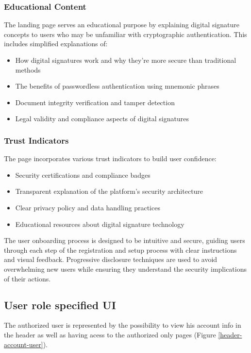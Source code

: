 \subsubsection{Educational Content}
The landing page serves an educational purpose by explaining digital signature concepts to users who may be unfamiliar with cryptographic authentication. This includes simplified explanations of:

\begin{itemize}
    \item How digital signatures work and why they're more secure than traditional methods
    \item The benefits of passwordless authentication using mnemonic phrases
    \item Document integrity verification and tamper detection
    \item Legal validity and compliance aspects of digital signatures
\end{itemize}

\subsubsection{Trust Indicators}
The page incorporates various trust indicators to build user confidence:

\begin{itemize}
    \item Security certifications and compliance badges
    \item Transparent explanation of the platform's security architecture
    \item Clear privacy policy and data handling practices
    \item Educational resources about digital signature technology
\end{itemize}

The user onboarding process is designed to be intuitive and secure, guiding users through each step of the registration and setup process with clear instructions and visual feedback. Progressive disclosure techniques are used to avoid overwhelming new users while ensuring they understand the security implications of their actions.

\subsection{User role specified UI}
The authorized user is represented by the possibility to view his account info in the header as well as having acess to the authorized only pages (Figure \ref{header-account-user}).

